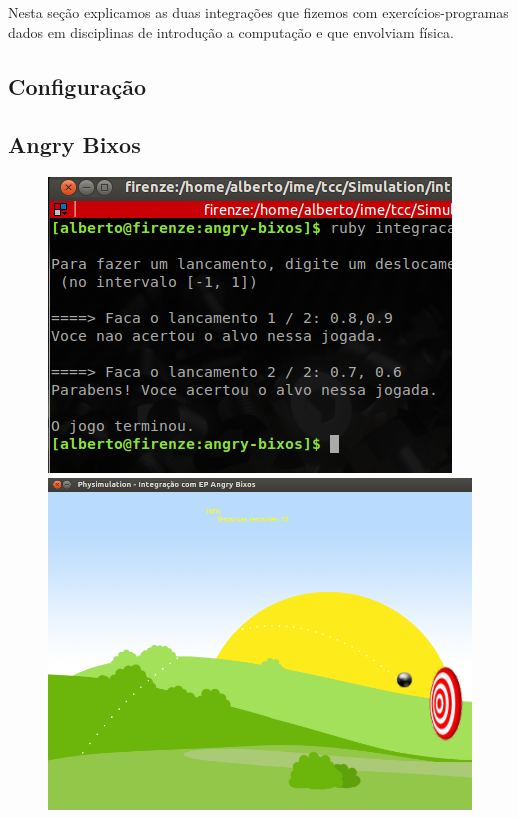 Nesta seção explicamos as duas integrações que fizemos com exercícios-programas dados em disciplinas de introdução a computação e que envolviam física.

\subsection{Configuração}
\subsection{Angry Bixos}

\begin{figure}[H]
    \centering
	\includegraphics[scale=0.6]{images/angry-bixos-3.png}
	\includegraphics[scale=0.22]{images/angry-bixos-4.png}

\end{figure}
